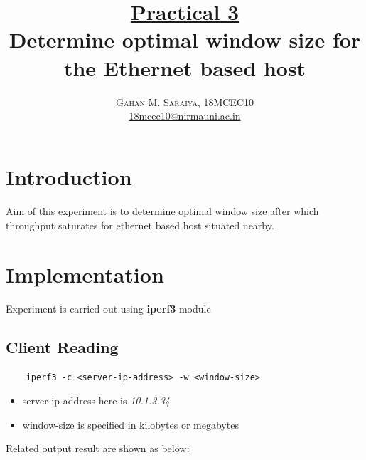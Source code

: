 \documentclass[paper=letter, fontsize=12pt]{article}
\title{\vspace{-15mm}\fontsize{24pt}{10pt}\selectfont\textbf{
		\underline{Practical 3}\\Determine optimal window size for the Ethernet based host}} %
\author{\large{\textsc{
		Gahan M. Saraiya, 18MCEC10 }}\\[2mm]
\normalsize \href{mailto:18mcec10@nirmauni.ac.in}{18mcec10@nirmauni.ac.in}\\[2mm] %
}
\date{}
\begin{document}
\maketitle %
\thispagestyle{fancy} %

\newcommand*\tick{\item[\Checkmark]}
\newcommand*\arrow{\item[$\Rightarrow$]}
\newcommand*\fail{\item[\XSolidBrush]}

\section{Introduction}
\paragraph{}
Aim of this experiment is to determine optimal window size after which throughput saturates for ethernet based host situated nearby.

\section{Implementation}
Experiment is carried out using \textbf{iperf3} module

\subsection*{Client Reading}
\begin{verbatim}
	iperf3 -c <server-ip-address> -w <window-size>
\end{verbatim}
\begin{itemize}
	\item server-ip-address here is \textit{10.1.3.34}
	\item window-size is specified in kilobytes or megabytes
\end{itemize}
Related output result are shown as below:

\inputminted[frame=lines, breaklines, linenos]{c}{../throughput_client_to_10.1.3.34.csv}
\end{document}
